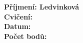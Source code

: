 \textbf{Příjmení: Ledvinková }\\
\textbf{Cvičení: }\\
\textbf{Datum: }\\
\textbf{Počet bodů: }\\
    
